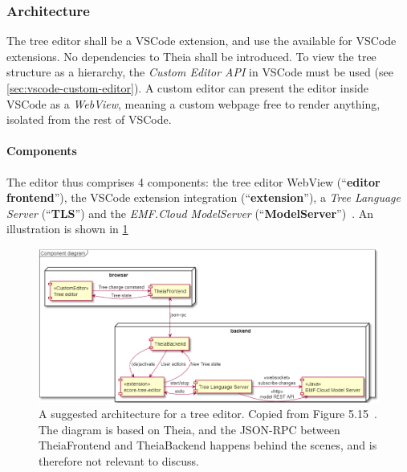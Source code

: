 \subsubsection{Architecture}

The tree editor shall be a \gls{VSCode} extension, and use the available  for \gls{VSCode} extensions.
No dependencies to \gls{Theia} shall be introduced.
To view the tree structure as a hierarchy, the \textit{Custom Editor API} in \gls{VSCode} must be used (see \cref{sec:vscode-custom-editor}).
A custom editor can present the editor inside \gls{VSCode} as a \textit{WebView}, meaning a custom webpage free to render anything, isolated from the rest of \gls{VSCode}.


\paragraph{Components}
The editor thus comprises 4 components: the tree editor WebView (``\textbf{editor frontend}''), the \gls{VSCode} extension integration (``\textbf{extension}''), a \textit{Tree Language Server} (``\textbf{TLS}'') and the \textit{EMF.Cloud ModelServer} (``\textbf{ModelServer}'')~\cite[p.~48,49]{rekstadModelingEnvironmentCloud2020}.
An illustration is shown in \cref{fig:pre-project-tree-editor-architecture}

\begin{figure}[htbp]
  \centering
  \includegraphics[width=\textwidth]{figures/pre-project/tree-editor-component-diagram.png}
  \caption[Tree Editor Architecture]{A suggested architecture for a tree editor. Copied from Figure 5.15~\cite[p.~49]{rekstadModelingEnvironmentCloud2020}. The diagram is based on \gls{Theia}, and the \gls{JSON-RPC} between TheiaFrontend and TheiaBackend happens behind the scenes, and is therefore not relevant to discuss.}\label{fig:pre-project-tree-editor-architecture}
\end{figure}


